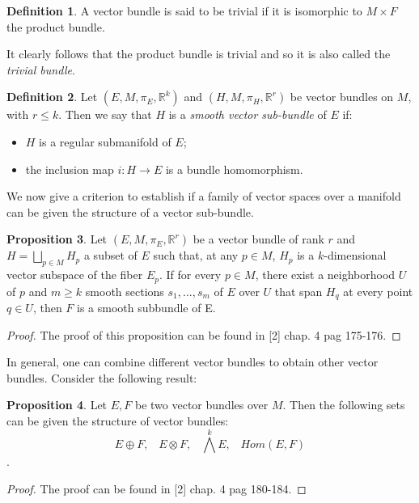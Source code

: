 \documentclass[12pt,a4paper]{report}
\theoremstyle{definition}
\newtheorem{Def}{Definition}[chapter]
\theoremstyle{Theorem}
\newtheorem{Prop}[Def]{Proposition}
\theoremstyle{definition}
\theoremstyle{definition}
\begin{document}
	\begin{Def}\label{Def_5.3}
		A vector bundle is said to be trivial if it is isomorphic to $M\times F$ the product bundle.
	\end{Def}
	It clearly follows that the product bundle is trivial and so it is also called the \textit{trivial bundle}.
	\begin{Def}
		Let $(E,M,\pi_E,\mathbb{R}^k)$ and $(H,M,\pi_H,\mathbb{R}^r)$ be vector bundles on $M$, with $r\leq k$. Then we say that $H$ is a \textit{smooth vector sub-bundle} of $E$ if:
		\begin{itemize}
			\item $H$ is a regular submanifold of $E$;
			\item the inclusion map $i:H\rightarrow E$ is a bundle homomorphism.
		\end{itemize}
	\end{Def}
	We now give a criterion to establish if a family of vector spaces over a manifold can be given the structure of a vector sub-bundle.
	\begin{Prop}
		Let $(E,M,\pi_E,\mathbb{R}^r)$ be a vector bundle of rank $r$ and $H=\bigsqcup_{p\in M}H_p$ a subset of $E$ such that, at any $p\in M$, $H_p$ is a $k$-dimensional vector subspace of the fiber $E_p$. If for every $p\in M$, there exist a neighborhood $U$ of $p$ and $m \geq k$ smooth sections $s_1,...,s_m$ of $E$ over $U$ that span $H_q$ at every point $q \in U$, then $F$ is a smooth subbundle of E.
	\end{Prop}
	\begin{proof}
		The proof of this proposition can be found in [2] chap. 4 pag 175-176.
	\end{proof}
	In general, one can combine different vector bundles to obtain other vector bundles. Consider the following result:
	\begin{Prop}
		Let $E,F$ be two vector bundles over $M$. Then the following sets can be given the structure of vector bundles:
		$$E\oplus F,\hspace{10pt}E\otimes F,\hspace{10pt}\bigwedge^k E,\hspace{10pt}Hom(E, F)$$.
	\end{Prop}
	\begin{proof}
		The proof can be found in [2] chap. 4 pag 180-184.
	\end{proof}
\end{document}
